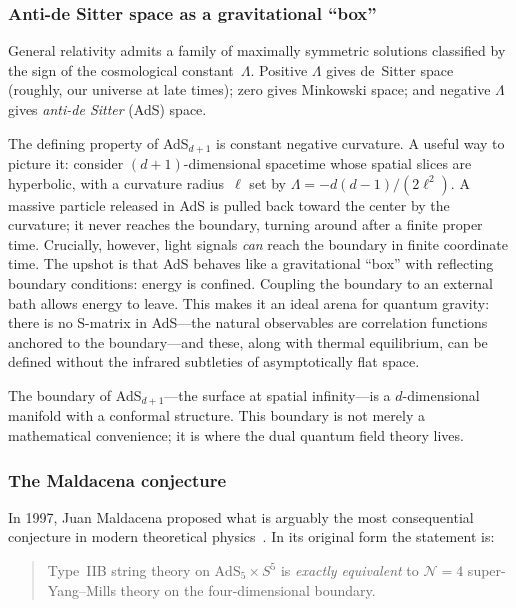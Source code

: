 \documentclass[11pt,letterpaper]{article}
\theoremstyle{plain}
\theoremstyle{definition}
\theoremstyle{remark}
\begin{document}
\subsubsection*{Anti-de Sitter space as a gravitational ``box''}

General relativity admits a family of maximally symmetric solutions
classified by the sign of the cosmological constant~$\Lambda$.
Positive $\Lambda$ gives de~Sitter space (roughly, our universe at
late times); zero gives Minkowski space; and negative $\Lambda$ gives
\emph{anti-de Sitter} (AdS) space.

The defining property of AdS$_{d+1}$ is constant negative curvature.
A useful way to picture it: consider $(d+1)$-dimensional spacetime
whose spatial slices are hyperbolic, with a curvature radius~$\ell$
set by $\Lambda = -d(d-1)/(2\ell^{2})$.  A massive particle released in
AdS is pulled back toward the center by the curvature; it never
reaches the boundary, turning around after a finite proper time.
Crucially, however, light signals \emph{can} reach the boundary in
finite coordinate time.  The upshot is that AdS behaves like a gravitational
``box'' with reflecting boundary conditions: energy is confined.
Coupling the boundary to an external bath allows energy to leave.  This makes it an ideal arena for quantum
gravity: there is no S-matrix in AdS---the natural observables are
correlation functions anchored to the boundary---and these, along
with thermal equilibrium, can be defined without the infrared
subtleties of asymptotically flat space.

The boundary of AdS$_{d+1}$---the surface at spatial infinity---is a
$d$-dimensional manifold with a conformal structure.  This boundary is
not merely a mathematical convenience; it is where the dual quantum
field theory lives.

\subsubsection*{The Maldacena conjecture}

In 1997, Juan Maldacena proposed what is arguably the most
consequential conjecture in modern theoretical
physics~\citeyearpar{maldacena1998}.  In its original form the statement
is:

\begin{quote}
Type~IIB string theory on $\mathrm{AdS}_{5}\times S^{5}$ is
\emph{exactly equivalent} to $\mathcal{N}=4$ super-Yang--Mills
theory on the four-dimensional boundary.
\end{quote}
\end{document}
